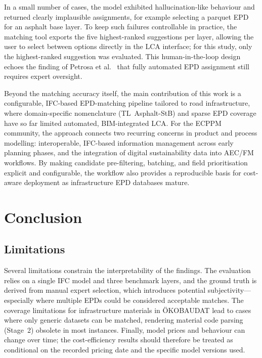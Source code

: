 \documentclass[10pt, a4paper, twocolumn]{article}
\begin{document}
In a small number of cases, the model exhibited hallucination-like behaviour and
returned clearly implausible assignments, for example selecting a parquet EPD for
an asphalt base layer. To keep such failures controllable in practice, the matching
tool exports the five highest-ranked suggestions per layer, allowing the user to
select between options directly in the LCA interface; for this study, only the
highest-ranked suggestion was evaluated. This human-in-the-loop design echoes the
finding of Petrosa et al.~\cite{Petrosa.2025} that fully automated EPD assignment
still requires expert oversight.

Beyond the matching accuracy itself, the main contribution of this work is a
configurable, IFC-based EPD-matching pipeline tailored to road infrastructure,
where domain-specific nomenclature (TL~Asphalt-StB) and sparse EPD coverage have so
far limited automated, BIM-integrated LCA. For the ECPPM community, the approach
connects two recurring concerns in product and process modelling: interoperable,
IFC-based information management across early planning phases, and the integration
of digital sustainability data into AEC/FM workflows. By making candidate
pre-filtering, batching, and field prioritisation explicit and configurable, the
workflow also provides a reproducible basis for cost-aware deployment as
infrastructure EPD databases mature.

\section{Conclusion}

\subsection{Limitations}

Several limitations constrain the interpretability of the findings. The
evaluation relies on a single IFC model and three benchmark layers, and the
ground truth is derived from manual expert selection, which introduces potential
subjectivity---especially where multiple EPDs could be considered acceptable
matches. The coverage limitations for infrastructure materials in ÖKOBAUDAT lead
to cases where only generic datasets can be matched, rendering material code
parsing (Stage~2) obsolete in most instances. Finally, model prices and behaviour
can change over time; the cost-efficiency results should therefore be treated as
conditional on the recorded pricing date and the specific model versions used.
\end{document}
